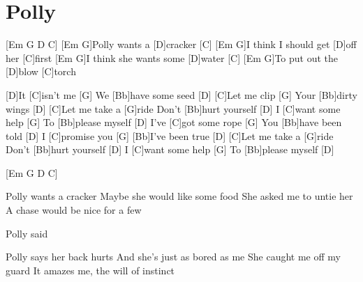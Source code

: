 \section{Polly}
\begin{multicols}{2}
\begin{guitar}

[Em G D C]{}
[Em G]Polly wants a [D]cracker [C]{}
[Em G]I think I should get [D]off her [C]first
[Em G]I think she wants some [D]water [C]{}
[Em G]To put out the [D]blow [C]torch


[D]It [C]isn't me [G]{}
We [Bb]have some seed [D]{}
[C]Let me clip [G]{}
Your [Bb]dirty wings [D]{}
[C]Let me take a [G]ride
Don't [Bb]hurt yourself [D]{}
I [C]want some help [G]{}
To [Bb]please myself [D]{}
I've [C]got some rope [G]{}
You [Bb]have been told [D]{}
I [C]promise you [G]{}
[Bb]I've been true [D]{}
[C]Let me take a [G]ride{}
Don't [Bb]hurt yourself [D]{}
I [C]want some help [G]{}
To [Bb]please myself [D]{}


[Em G D C]{}


Polly wants a cracker
Maybe she would like some food
She asked me to untie her
A chase would be nice for a few


Polly said

Polly says her back hurts
And she's just as bored as me
She caught me off my guard
It amazes me, the will of instinct
\end{guitar}
\end{multicols}
